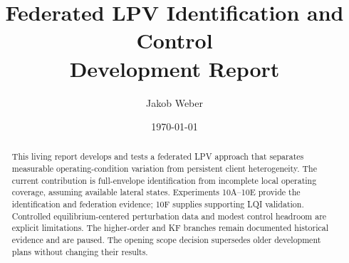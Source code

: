 \documentclass[11pt,a4paper]{article}
\title{Federated LPV Identification and Control\\\large Development Report}
\author{Jakob Weber}
\date{\today}
\begin{document}
\maketitle
\begin{abstract}
This living report develops and tests a federated LPV approach that separates
measurable operating-condition variation from persistent client heterogeneity.
The current contribution is full-envelope identification from incomplete local
operating coverage, assuming available lateral states. Experiments 10A--10E
provide the identification and federation evidence; 10F supplies supporting
LQI validation. Controlled equilibrium-centered perturbation data and modest
control headroom are explicit limitations. The higher-order and KF branches
remain documented historical evidence and are paused. The opening scope
decision supersedes older development plans without changing their results.
\end{abstract}
\tableofcontents
\clearpage


\end{document}
